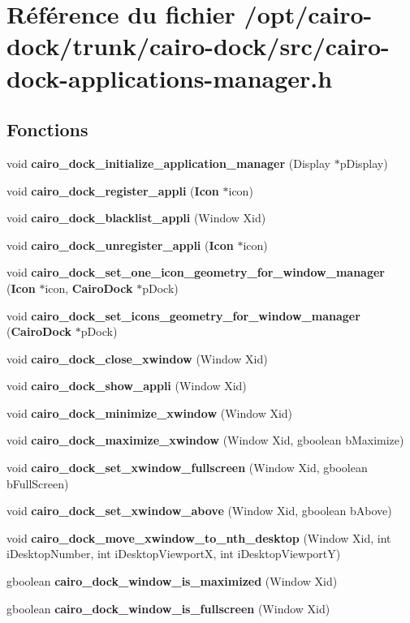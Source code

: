 \section{Référence du fichier /opt/cairo-dock/trunk/cairo-dock/src/cairo-dock-applications-manager.h}
\label{cairo-dock-applications-manager_8h}
\subsection*{Fonctions}
\begin{CompactItemize}
\item 
void {\bf cairo\_\-dock\_\-initialize\_\-application\_\-manager} (Display $\ast$pDisplay)
\item 
void {\bf cairo\_\-dock\_\-register\_\-appli} ({\bf Icon} $\ast$icon)
\item 
void {\bf cairo\_\-dock\_\-blacklist\_\-appli} (Window Xid)
\item 
void {\bf cairo\_\-dock\_\-unregister\_\-appli} ({\bf Icon} $\ast$icon)
\item 
void {\bf cairo\_\-dock\_\-set\_\-one\_\-icon\_\-geometry\_\-for\_\-window\_\-manager} ({\bf Icon} $\ast$icon, {\bf CairoDock} $\ast$pDock)
\item 
void {\bf cairo\_\-dock\_\-set\_\-icons\_\-geometry\_\-for\_\-window\_\-manager} ({\bf CairoDock} $\ast$pDock)
\item 
void {\bf cairo\_\-dock\_\-close\_\-xwindow} (Window Xid)
\item 
void {\bf cairo\_\-dock\_\-show\_\-appli} (Window Xid)
\item 
void {\bf cairo\_\-dock\_\-minimize\_\-xwindow} (Window Xid)
\item 
void {\bf cairo\_\-dock\_\-maximize\_\-xwindow} (Window Xid, gboolean bMaximize)
\item 
void {\bf cairo\_\-dock\_\-set\_\-xwindow\_\-fullscreen} (Window Xid, gboolean bFullScreen)
\item 
void {\bf cairo\_\-dock\_\-set\_\-xwindow\_\-above} (Window Xid, gboolean bAbove)
\item 
void {\bf cairo\_\-dock\_\-move\_\-xwindow\_\-to\_\-nth\_\-desktop} (Window Xid, int iDesktopNumber, int iDesktopViewportX, int iDesktopViewportY)
\item 
gboolean {\bf cairo\_\-dock\_\-window\_\-is\_\-maximized} (Window Xid)
\item 
gboolean {\bf cairo\_\-dock\_\-window\_\-is\_\-fullscreen} (Window Xid)

\end{CompactItemize}
